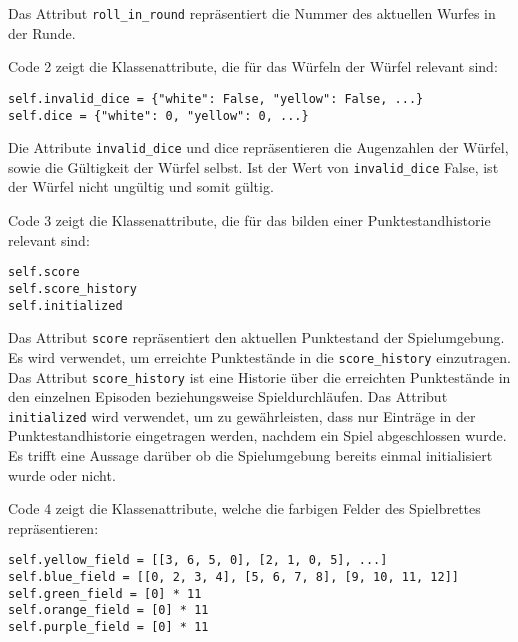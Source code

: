 Das Attribut \texttt{roll\_in\_round} repräsentiert die Nummer des aktuellen Wurfes in der Runde.\\

\begin{minipage}{\linewidth}
Code 2 zeigt die Klassenattribute, die für das Würfeln der Würfel relevant sind:
\vspace{0.5cm}
\begin{lstlisting}[caption={Klassenattribute für Würfel}, basicstyle=\ttfamily]
self.invalid_dice = {"white": False, "yellow": False, ...}
self.dice = {"white": 0, "yellow": 0, ...}
\end{lstlisting}
\end{minipage}

Die Attribute \texttt{invalid\_dice} und dice repräsentieren die Augenzahlen der Würfel, sowie die Gültigkeit der Würfel selbst. Ist der Wert von \texttt{invalid\_dice} False, ist der Würfel nicht ungültig und somit gültig.\\

\begin{minipage}{\linewidth}
Code 3 zeigt die Klassenattribute, die für das bilden einer Punktestandhistorie relevant sind:
\vspace{0.5cm}
\begin{lstlisting}[caption={Klassenattribute für die Nachvollziehbarkeit von Punkteständen}, basicstyle=\ttfamily]
self.score
self.score_history
self.initialized
\end{lstlisting}
\end{minipage}

Das Attribut \texttt{score} repräsentiert den aktuellen Punktestand der Spielumgebung. Es wird verwendet, um erreichte Punktestände in die \texttt{score\_history} einzutragen. Das Attribut \texttt{score\_history} ist eine Historie über die erreichten Punktestände in den einzelnen Episoden beziehungsweise Spieldurchläufen. Das Attribut \texttt{initialized} wird verwendet, um zu gewährleisten, dass nur Einträge in der Punktestandhistorie eingetragen werden, nachdem ein Spiel abgeschlossen wurde. Es trifft eine Aussage darüber ob die Spielumgebung bereits einmal initialisiert wurde oder nicht.\\

\begin{minipage}{\linewidth}
Code 4 zeigt die Klassenattribute, welche die farbigen Felder des Spielbrettes repräsentieren:
\vspace{0.5cm}
\begin{lstlisting}[caption={Klassenattribute für die farbigen Felder des Spiels}, basicstyle=\ttfamily]
self.yellow_field = [[3, 6, 5, 0], [2, 1, 0, 5], ...]
self.blue_field = [[0, 2, 3, 4], [5, 6, 7, 8], [9, 10, 11, 12]]
self.green_field = [0] * 11
self.orange_field = [0] * 11
self.purple_field = [0] * 11
\end{lstlisting}
\end{minipage}

